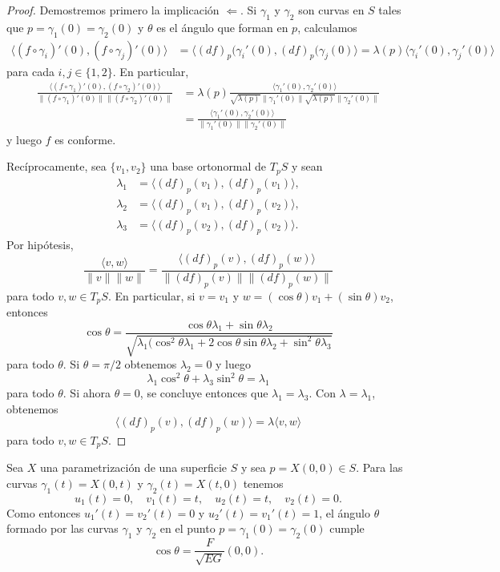 \begin{proof}
	Demostremos primero la implicación $\Longleftarrow$. 
	Si $\gamma_1$ y $\gamma_2$ son curvas en $S$ tales que $p=\gamma_1(0)=\gamma_2(0)$ y $\theta$ es el ángulo que forman en $p$, calculamos
	\begin{align*}
		\langle (f\circ\gamma_i)'(0),(f\circ\gamma_j)'(0)\rangle
		&=\langle (df)_p(\gamma_i'(0),(df)_p(\gamma_j(0)\rangle=\lambda(p)\langle \gamma_i'(0),\gamma_j'(0)\rangle
	\end{align*}
	para cada $i,j\in\{1,2\}$. En particular,
	\begin{align*}
		\frac{\langle (f\circ\gamma_1)'(0),(f\circ\gamma_2)'(0)\rangle}{\|(f\circ\gamma_1)'(0)\|\|(f\circ\gamma_2)'(0)\|}
		&=\lambda(p)\frac{\langle \gamma_1'(0),\gamma_2'(0)\rangle}{\sqrt{\lambda(p)}\|\gamma_1'(0)\|\sqrt{\lambda(p)}\|\gamma_2'(0)\|}\\
		&=\frac{\langle \gamma_1'(0),\gamma_2'(0)\rangle}{\|\gamma_1'(0)\|\|\gamma_2'(0)\|}
	\end{align*}
	y luego $f$ es conforme. 

	Recíprocamente, sea $\{v_1,v_2\}$ una base ortonormal de $T_pS$ y sean
	\begin{align*}
		\lambda_1&=\langle (df)_p(v_1),(df)_p(v_1)\rangle,\\
		\lambda_2&=\langle (df)_p(v_1),(df)_p(v_2)\rangle,\\
		\lambda_3&=\langle (df)_p(v_2),(df)_p(v_2)\rangle.
	\end{align*}
	Por hipótesis, 
	\[
		\frac{\langle v,w\rangle}{\|v\|\|w\|}=\frac{\langle (df)_p(v),(df)_p(w)\rangle}{\|(df)_p(v)\|\|(df)_p(w)\|}
	\]
	para todo $v,w\in T_pS$. En particular, si $v=v_1$ y $w=(\cos \theta)v_1+(\sin\theta)v_2$, entonces
	\[
		\cos\theta=\frac{\cos\theta\lambda_1+\sin\theta\lambda_2}{\sqrt{\lambda_1(\cos^2\theta\lambda_1+2\cos\theta\sin\theta\lambda_2+\sin^2\theta\lambda_3}}
	\]
	para todo $\theta$. Si $\theta=\pi/2$ obtenemos $\lambda_2=0$ y luego 
	\[
		\lambda_1\cos^2\theta+\lambda_3\sin^2\theta=\lambda_1
	\]
	para todo $\theta$. Si ahora $\theta=0$, se concluye entonces que $\lambda_1=\lambda_3$. Con $\lambda=\lambda_1$, obtenemos
	\[
		\langle (df)_p(v),(df)_p(w)\rangle=\lambda\langle v,w\rangle
	\]
	para todo $v,w\in T_pS$.
\end{proof}

\begin{example}
	Sea $X$ una parametrización de una superficie $S$ y sea $p=X(0,0)\in S$. Para 
	las curvas $\gamma_1(t)=X(0,t)$ y $\gamma_2(t)=X(t,0)$ tenemos
	\[
		u_1(t)=0,\quad
		v_1(t)=t,\quad
		u_2(t)=t,\quad
		v_2(t)=0.
	\]
	Como entonces $u_1'(t)=v_2'(t)=0$ y $u_2'(t)=v_1'(t)=1$, el ángulo $\theta$ formado por las curvas
	$\gamma_1$ y $\gamma_2$ en el punto $p=\gamma_1(0)=\gamma_2(0)$ cumple
	\[
		\cos\theta=\frac{F}{\sqrt{EG}}(0,0).
	\]
\end{example}

